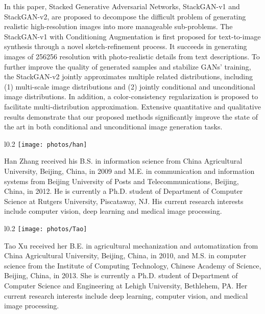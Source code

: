 \documentclass[10pt,journal,letterpaper,compsoc]{IEEEtran}
\begin{document}
In this paper, Stacked Generative Adversarial Networks, StackGAN-v1 and StackGAN-v2, are proposed to decompose the difficult problem of generating realistic high-resolution images into more manageable sub-problems. The StackGAN-v1 with Conditioning Augmentation is first proposed for text-to-image synthesis through a novel sketch-refinement process. It succeeds in generating images of 256256 resolution with photo-realistic details from text descriptions. To further improve the quality of generated samples and stabilize GANs' training, the StackGAN-v2 jointly approximates multiple related distributions, including (1) multi-scale image distributions and (2) jointly conditional and unconditional image distributions. In addition, a color-consistency regularization is proposed to facilitate multi-distribution approximation. Extensive quantitative and qualitative results demonstrate that our proposed methods significantly improve the state of the art in both conditional and unconditional image generation tasks. 













\vspace{+10pt}
\small
\begin{wrapfigure}{l}{0.2\columnwidth}
\texttt{[image: photos/han]}
\end{wrapfigure}
 Han Zhang received his B.S. in information science from China Agricultural University, Beijing, China, in 2009 and M.E. in communication and information systems from Beijing University of Posts and Telecommunications, Beijing, China, in 2012. He is currently a Ph.D. student of Department of Computer Science at Rutgers University, Piscataway, NJ. His current research interests include computer vision, deep learning and medical image processing.

\vspace{+5pt}
\begin{wrapfigure}{l}{0.2\columnwidth}
\texttt{[image: photos/Tao]}
\end{wrapfigure}
 Tao Xu received her B.E. in agricultural mechanization and automatization from China Agricultural University, Beijing, China, in 2010, and M.S. in computer science from the Institute of Computing Technology, Chinese Academy of Science, Beijing, China, in 2013. She is currently a Ph.D. student of Department of Computer Science and Engineering at Lehigh University, Bethlehem, PA. Her current research interests include deep learning, computer vision, and medical image processing.
\end{document}
